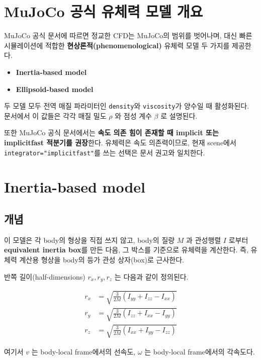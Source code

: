 \documentclass[11pt,a4paper]{article}
\begin{document}
\section{MuJoCo 공식 유체력 모델 개요}

MuJoCo 공식 문서에 따르면 정교한 CFD는 MuJoCo의 범위를 벗어나며, 대신 빠른 시뮬레이션에 적합한 \textbf{현상론적(phenomenological)} 유체력 모델 두 가지를 제공한다.

\begin{itemize}[leftmargin=2em]
  \item \textbf{Inertia-based model}
  \item \textbf{Ellipsoid-based model}
\end{itemize}

두 모델 모두 전역 매질 파라미터인 \texttt{density}와 \texttt{viscosity}가 양수일 때 활성화된다. 문서에서 이 값들은 각각 매질 밀도 $\rho$ 와 점성 계수 $\beta$ 로 설명된다.

또한 MuJoCo 공식 문서에서는 \textbf{속도 의존 힘이 존재할 때 implicit 또는 implicitfast 적분기를 권장}한다. 유체력은 속도 의존력이므로, 현재 scene에서 \texttt{integrator="implicitfast"}를 쓰는 선택은 문서 권고와 일치한다.

\section{Inertia-based model}

\subsection{개념}

이 모델은 각 body의 형상을 직접 쓰지 않고, body의 질량 $M$ 과 관성행렬 $I$ 로부터 \textbf{equivalent inertia box}를 만든 다음, 그 박스를 기준으로 유체력을 계산한다. 즉, 유체력 계산용 형상을 body의 등가 관성 상자(box)로 근사한다.

반쪽 길이(half-dimensions) $r_x, r_y, r_z$ 는 다음과 같이 정의된다.

\begin{align}
r_x &= \sqrt{\frac{3}{2M}\left(I_{yy}+I_{zz}-I_{xx}\right)} \\
r_y &= \sqrt{\frac{3}{2M}\left(I_{zz}+I_{xx}-I_{yy}\right)} \\
r_z &= \sqrt{\frac{3}{2M}\left(I_{xx}+I_{yy}-I_{zz}\right)}
\end{align}

여기서 $v$ 는 body-local frame에서의 선속도, $\omega$ 는 body-local frame에서의 각속도다.
\end{document}
